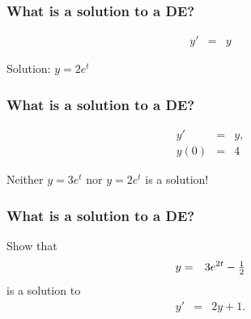 \begin{frame}
  \frametitle{What is a solution to a DE?}

  \begin{eqnarray*}
    y' & = & y
  \end{eqnarray*}

  Solution: $y=2e^t$



\end{frame}


\begin{frame}
  \frametitle{What is a solution to a DE?}

  \begin{eqnarray*}
    y' & = & y, \\
    y(0) & = & 4
  \end{eqnarray*}

  Neither $y = 3e^t$ nor $y=2e^t$ is a solution! 


\end{frame}


\begin{frame}
  \frametitle{What is a solution to a DE?}

  Show that 
  \begin{eqnarray*}
    y & = & 3 e^{2t} - \mbox{$\frac{1}{2}$}
  \end{eqnarray*}
  is a solution to
  \begin{eqnarray*}
    y' & = & 2y + 1.
  \end{eqnarray*}



\end{frame}


